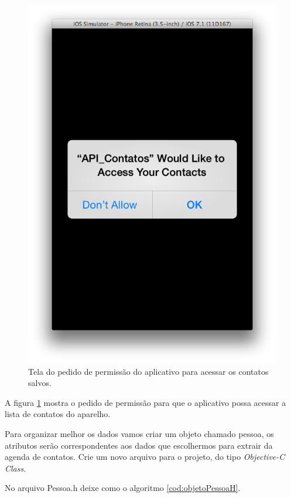 \documentclass[a4paper,12pt,brazil,oneside]{book}
\begin{document}
\begin{figure}[H]
  \centering
  \includegraphics[totalheight=0.55\textheight]{figuras/4/api_contatos2.png}
  \caption{Tela do pedido de permissão do aplicativo para acessar os contatos salvos.}
  \label{fig:permissaoApp2}
\end{figure}

A figura \ref{fig:permissaoApp2} mostra o pedido de permissão para que o aplicativo possa acessar a lista de contatos do aparelho.

Para organizar melhor os dados vamos criar um objeto chamado pessoa, os atributos serão correspondentes aos dados que escolhermos para extrair da agenda de contatos.
Crie um novo arquivo para o projeto, do tipo \emph{Objective-C Class}.

No arquivo Pessoa.h deixe como o algoritmo \ref{cod:objetoPessoaH}.
\end{document}
